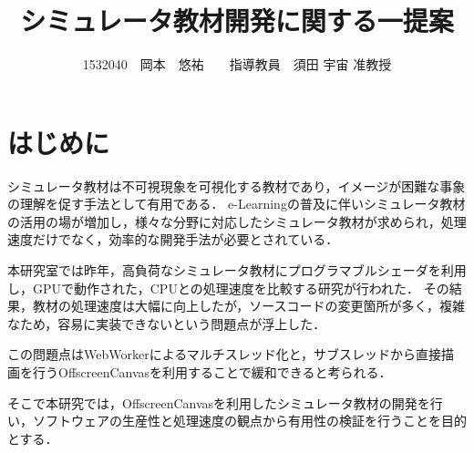 \documentclass[twocolumn,10pt,a4j]{jsarticle}
\title{シミュレータ教材開発に関する一提案}
\author{1532040　岡本　悠祐　　指導教員　須田 宇宙 准教授}
\date{}
\begin{document}
\maketitle
\section{はじめに}
シミュレータ教材は不可視現象を可視化する教材であり，イメージが困難な事象の理解を促す手法として有用である．
e-Learningの普及に伴いシミュレータ教材の活用の場が増加し，様々な分野に対応したシミュレータ教材が求められ，処理速度だけでなく，効率的な開発手法が必要とされている．

本研究室では昨年，高負荷なシミュレータ教材にプログラマブルシェーダを利用し，GPUで動作された，CPUとの処理速度を比較する研究が行われた\cite{book}．
その結果，教材の処理速度は大幅に向上したが，ソースコードの変更箇所が多く，複雑なため，容易に実装できないという問題点が浮上した．

この問題点はWebWorkerによるマルチスレッド化と，サブスレッドから直接描画を行うOffscreenCanvasを利用することで緩和できると考られる．

そこで本研究では，OffscreenCanvasを利用したシミュレータ教材の開発を行い，ソフトウェアの生産性と処理速度の観点から有用性の検証を行うことを目的とする．
\end{document}
